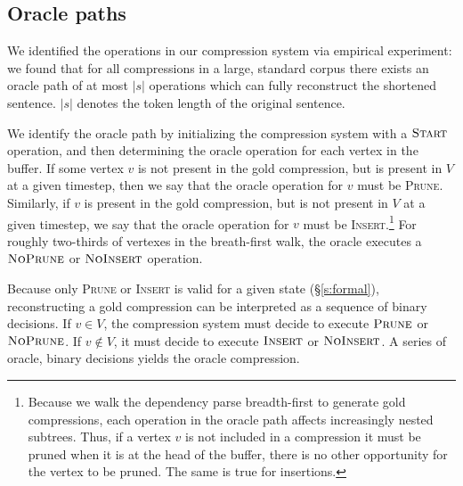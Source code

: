 \documentclass[11pt,a4paper]{article}
\begin{document}
\subsection{Oracle paths}\label{s:oracle}

We identified the operations in our compression system via empirical experiment: we found that for all compressions in a large, standard corpus \cite{filippova2013overcoming} there exists an oracle path of at most $|s|$ operations which can fully reconstruct the shortened sentence. $|s|$ denotes the token length of the original sentence.

We identify the oracle path by initializing the compression system with a $\textsc{Start}$ operation, and then determining the oracle operation for each vertex in the buffer. If some vertex $v$ is not present in the gold compression, but is present in ${V}$ at a given timestep, then we say that the oracle operation for $v$ must be \textsc{Prune}. Similarly, if $v$ is present in the gold compression, but is not present in ${V}$ at a given timestep, we say that the oracle operation for $v$ must be \textsc{Insert}.\footnote{Because we walk the dependency parse breadth-first to generate gold compressions, each operation in the oracle path affects increasingly nested subtrees. Thus, if a vertex $v$ is not included in a compression it must be pruned when it is at the head of the buffer, there is no other opportunity for the vertex to be pruned. The same is true for insertions.} For roughly two-thirds of vertexes in the breath-first walk, the oracle executes a $\textsc{NoPrune}$ or $\textsc{NoInsert}$ operation.

Because only \textsc{Prune} or \textsc{Insert} is valid for a given state (\S\ref{s:formal}), reconstructing a gold compression can be interpreted as a sequence of binary decisions. If $v \in V$, the compression system must decide to execute $\textsc{Prune}$ or $\textsc{NoPrune}$. If $v \notin V$, it must decide to execute $\textsc{Insert}$ or $\textsc{NoInsert}$. A series of oracle, binary decisions yields the oracle compression.
\end{document}
